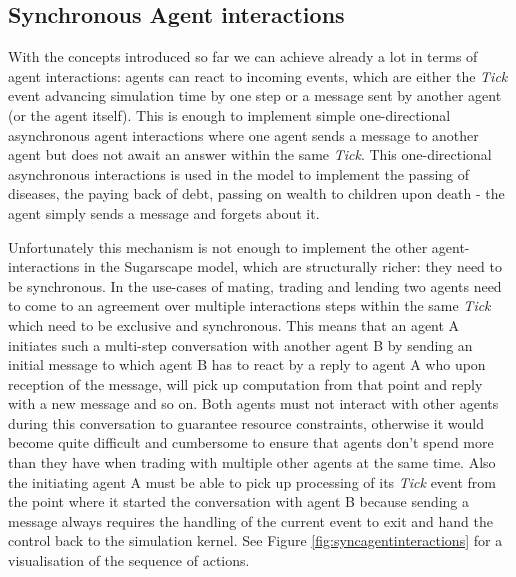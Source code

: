 \subsection{Synchronous Agent interactions}
With the concepts introduced so far we can achieve already a lot in terms of agent interactions: agents can react to incoming events, which are either the \textit{Tick} event advancing simulation time by one step or a message sent by another agent (or the agent itself). This is enough to implement simple one-directional asynchronous agent interactions where one agent sends a message to another agent but does not await an answer within the same \textit{Tick}. This one-directional asynchronous interactions is used in the model to implement the passing of diseases, the paying back of debt, passing on wealth to children upon death - the agent simply sends a message and forgets about it.

Unfortunately this mechanism is not enough to implement the other agent-interactions in the Sugarscape model, which are structurally richer: they need to be synchronous. In the use-cases of mating, trading and lending two agents need to come to an agreement over multiple interactions steps within the same \textit{Tick} which need to be exclusive and synchronous.  This means that an agent A initiates such a multi-step conversation with another agent B by sending an initial message to which agent B has to react by a reply to agent A who upon reception of the message, will pick up computation from that point and reply with a new message and so on. Both agents must not interact with other agents during this conversation to guarantee resource constraints, otherwise it would become quite difficult and cumbersome to ensure that agents don't spend more than they have when trading with multiple other agents at the same time. Also the initiating agent A must be able to pick up processing of its \textit{Tick} event from the point where it started the conversation with agent B because sending a message always requires the handling of the current event to exit and hand the control back to the simulation kernel. See Figure \ref{fig:syncagentinteractions} for a visualisation of the sequence of actions.

